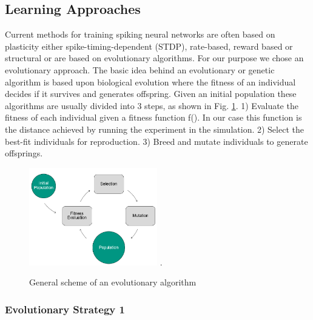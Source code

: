 \subsection{Learning Approaches}
Current methods for training spiking neural networks are often based on plasticity either spike-timing-dependent (STDP), rate-based, reward based or structural or are based on evolutionary algorithms. %
 For our purpose we chose an evolutionary approach. The basic idea behind an evolutionary or genetic algorithm is based upon biological evolution where the fitness of an individual decides if it survives and generates offspring. Given an initial population these algorithms are usually divided into 3 steps, as shown in Fig. \ref{evo_base}. 1) Evaluate the fitness of each individual given a fitness function f(). In our case this function is the distance achieved by running the experiment in the simulation. 2) Select the best-fit individuals for reproduction. 3) Breed and mutate individuals to generate offsprings.

\begin{figure}[H]
	\centering
	\includegraphics[width=2.2in]{img/evo_base.png}
	\DeclareGraphicsExtensions.
	\caption{General scheme of an evolutionary algorithm}
	\label{evo_base}
\end{figure}

\subsubsection{Evolutionary Strategy 1}


